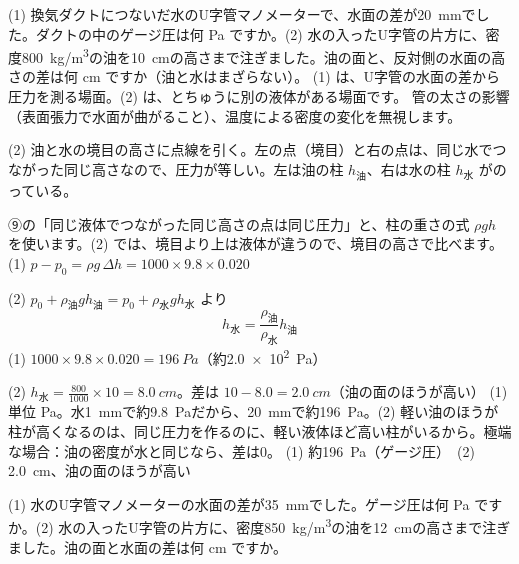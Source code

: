 \begin{phreidai}
\label{ph:力-12:ex15}(1) 換気ダクトにつないだ水のU字管マノメーターで、水面の差が\qty{20}{mm}でした。ダクトの中のゲージ圧は何 Pa ですか。(2) 水の入ったU字管の片方に、密度\qty{800}{kg/m^3}の油を\qty{10}{cm}の高さまで注ぎました。油の面と、反対側の水面の高さの差は何 cm ですか（油と水はまざらない）。
\phbamen
(1) は、U字管の水面の差から圧力を測る場面。(2) は、とちゅうに別の液体がある場面です。
\phmushi
管の太さの影響（表面張力で水面が曲がること）、温度による密度の変化を無視します。
\phzu
\noindent\begin{minipage}[c]{0.36\linewidth}\centering
{}
\end{minipage}\hfill
\begin{minipage}[c]{0.61\linewidth}\raggedright
(2) 油と水の境目の高さに点線を引く。左の点（境目）と右の点は、同じ水でつながった同じ高さなので、圧力が等しい。左は油の柱 $h_{\text{油}}$、右は水の柱 $h_{\text{水}}$ がのっている。
\end{minipage}
\phriyu
⑨の「同じ液体でつながった同じ高さの点は同じ圧力」と、柱の重さの式 $\rho gh$ を使います。(2) では、境目より上は液体が違うので、境目の高さで比べます。
\phtateru
(1) $p-p_0=\rho g\,\Delta h=1000\times9.8\times0.020$\par
(2) $p_0+\rho_{\text{油}}gh_{\text{油}}=p_0+\rho_{\text{水}}gh_{\text{水}}$ より
\[ h_{\text{水}}=\frac{\rho_{\text{油}}}{\rho_{\text{水}}}h_{\text{油}} \]
\phtoku
(1) $1000\times9.8\times0.020=\qty{196}{Pa}$（約\qty{2.0e2}{Pa}）\par
(2) $h_{\text{水}}=\tfrac{800}{1000}\times10=\qty{8.0}{cm}$。差は $10-8.0=\qty{2.0}{cm}$（油の面のほうが高い）
\phtashikame
(1) 単位 Pa。水\qty{1}{mm}で約\qty{9.8}{Pa}だから、\qty{20}{mm}で約\qty{196}{Pa}。(2) 軽い油のほうが柱が高くなるのは、同じ圧力を作るのに、軽い液体ほど高い柱がいるから。極端な場合：油の密度が水と同じなら、差は0。
\kotae (1) 約\qty{196}{Pa}（ゲージ圧）　(2) \qty{2.0}{cm}、油の面のほうが高い
\end{phreidai}
\begin{jibun}
(1) 水のU字管マノメーターの水面の差が\qty{35}{mm}でした。ゲージ圧は何 Pa ですか。(2) 水の入ったU字管の片方に、密度\qty{850}{kg/m^3}の油を\qty{12}{cm}の高さまで注ぎました。油の面と水面の差は何 cm ですか。
\end{jibun}

